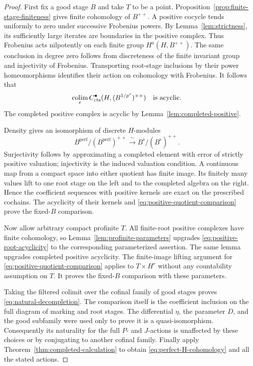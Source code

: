 \begin{proof}
First fix a good stage $B$ and take $T$ to be a point.
Proposition~\ref{prop:finite-stage-finiteness} gives finite
cohomology of $B^{++}$.  A positive cocycle tends uniformly to
zero under successive Frobenius powers.  By
Lemma~\ref{lem:strictness}, its sufficiently large iterates are
boundaries in the positive complex.  Thus Frobenius acts
nilpotently on each finite group $H^a(H,B^{++})$.
The same conclusion in degree zero follows from discreteness
of the finite invariant group and injectivity of Frobenius.
Transporting root-stage inclusions by their power
homeomorphisms identifies their action on cohomology with
Frobenius.  It follows that
\begin{equation}
 \label{eq:positive-root-acyclicity}
 \operatorname*{colim}_eC^\bullet_{\mathrm{cts}}(H,(B^{1/p^e})^{++})
 \quad\text{is acyclic}.
\end{equation}
The completed positive complex is acyclic by
Lemma~\ref{lem:completed-positive}.

Density gives an isomorphism of discrete $H$-modules
\begin{equation}
 \label{eq:positive-quotient-comparison}
 B^{\mathrm{perf}}/(B^{\mathrm{perf}})^{++}
 \xrightarrow{\ \sim\ }
 B^\flat/(B^\flat)^{++}.
\end{equation}
Surjectivity follows by approximating a completed element
with error of strictly positive valuation; injectivity is
the induced valuation condition.  A continuous map from a
compact space into either quotient has finite image.
Its finitely many values lift to one root stage on the left
and to the completed algebra on the right.  Hence the
coefficient sequences with positive kernels are exact on
the prescribed cochains.  The acyclicity of their kernels
and \eqref{eq:positive-quotient-comparison} prove the
fixed-$B$ comparison.

Now allow arbitrary compact profinite $T$.
All finite-root positive complexes have finite cohomology,
so Lemma~\ref{lem:profinite-parameters} upgrades
\eqref{eq:positive-root-acyclicity} to the corresponding
parameterized assertion.  The same lemma upgrades completed
positive acyclicity.  The finite-image lifting argument for
\eqref{eq:positive-quotient-comparison} applies to
$T\times H^r$ without any countability assumption on $T$.
It proves the fixed-$B$ comparison with these parameters.

Taking the filtered colimit over the cofinal family of
good stages proves \eqref{eq:natural-decompletion}.
The comparison itself is the coefficient inclusion on the
full diagram of marking and root stages.  The differential
$\eta$, the parameter $D$, and the good subfamily were used
only to prove it is a quasi-isomorphism.  Consequently its
naturality for the full $P$- and $J$-actions is unaffected by
these choices or by conjugating to another cofinal family.
Finally apply Theorem~\ref{thm:completed-calculation} to
obtain \eqref{eq:perfect-H-cohomology} and all the stated
actions.
\end{proof}

